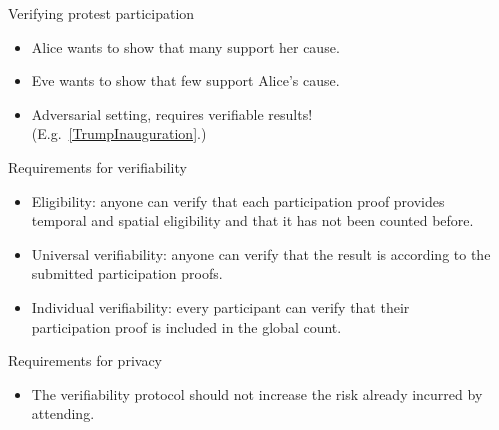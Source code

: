 \begin{columns}[t]

  \begin{column}{0.32\linewidth}

    \begin{redblock}{Verifying protest participation}
      \begin{itemize}
        \item Alice wants to show that many support her cause.
        \item Eve wants to show that few support Alice's cause.
        \item {\color{red} Adversarial setting, requires verifiable results!}
          (E.g.\ \cref{TrumpInauguration}.)
      \end{itemize}
    \end{redblock}

    \begin{blueblock}{Requirements for verifiability}
      \begin{itemize}
        \item\label{EligibilityVerif} Eligibility: anyone can verify that each 
          participation proof provides temporal and spatial eligibility and that 
          it has not been counted before.

        \item\label{UniversalVerif} Universal verifiability: anyone can verify 
          that the result is according to the submitted participation proofs.

        \item\label{IndividualVerif} Individual verifiability: every participant 
          can verify that their participation proof is included in the global 
          count.
      \end{itemize}
    \end{blueblock}

    \begin{blueblock}{Requirements for privacy}
      \begin{itemize}
        \item The verifiability protocol should not increase the risk already 
          incurred by attending.
      \end{itemize}
    \end{blueblock}

  \end{column}

  \hfill

  \begin{column}{0.32\linewidth}


\end{column}
\end{columns}
